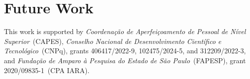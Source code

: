 \documentclass[sigconf,natbib=false]{acmart}
\begin{document}
\section{Future Work}

\begin{acks}
This work is supported by \textit{Coordenação de Aperfeiçoamento de Pessoal de Nível Superior}~(CAPES), \textit{Conselho Nacional de Desenvolvimento Científico e Tecnológico}~(CNPq), grants 406417/2022-9, 102475/2024-5, and 312209/2022-3, and \textit{Fundação de Amparo à Pesquisa do Estado de São Paulo}~(FAPESP), grant 2020/09835-1~(CPA IARA). 
\end{acks}


\printbibliography
\end{document}
